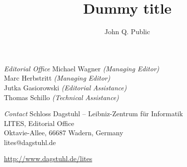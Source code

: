 \documentclass[a4paper,UKenglish]{litesmaster}
\begin{document}
\begin{publicationinfo}
\bigskip
\emph{Editorial Office}\newline
Michael Wagner \emph{(Managing Editor)}\\
Marc Herbstritt \emph{(Managing Editor)}\\
Jutka Gasiorowski \emph{(Editorial Assistance)}\\
Thomas Schillo \emph{(Technical Assistance)}

\bigskip
\emph{Contact}\newline
Schloss Dagstuhl -- Leibniz-Zentrum f\"ur Informatik\\
LITES, Editorial Office\\
Oktavie-Allee, 66687 Wadern, Germany\\ 
lites@dagstuhl.de


\vfill

\url{http://www.dagstuhl.de/lites}
 
 \thispagestyle{empty}
 \onecolumn
\end{publicationinfo}


\begin{contentslist}

\contitem
\title{Dummy title}
\author{John Q. Public}

\end{contentslist}
\end{document}
